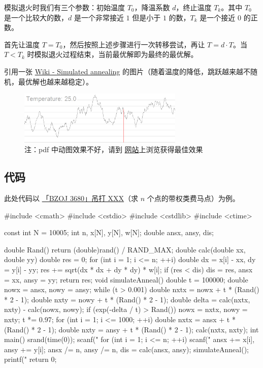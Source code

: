 模拟退火时我们有三个参数：初始温度 $T_0$，降温系数 $d$，终止温度 $T_k$。其中 $T_0$ 是一个比较大的数，$d$ 是一个非常接近 $1$ 但是小于 $1$ 的数，$T_k$ 是一个接近 $0$ 的正数。

首先让温度 $T=T_0$，然后按照上述步骤进行一次转移尝试，再让 $T=d\cdot T$。当 $T<T_k$ 时模拟退火过程结束，当前最优解即为最终的最优解。

引用一张 \href{https://en.wikipedia.org/wiki/Simulated_annealing}{Wiki - Simulated annealing} 的图片（随着温度的降低，跳跃越来越不随机，最优解也越来越稳定）。


\begin{figure}[htbp]
\centering
\includegraphics[width=0.7\textwidth]{docs/misc/images/a-0.png} 
\caption{注：pdf 中动图效果不好，请到 \href{https://oi-wiki.org/misc/simulated-annealing/}{网站}上浏览获得最佳效果}
\end{figure}

\hr

\subsection{代码}

此处代码以 \href{https://www.lydsy.com/JudgeOnline/problem.php?id=3680}{「BZOJ 3680」吊打 XXX}（求 $n$ 个点的带权类费马点）为例。

\begin{cppcode}
#include <cmath>
#include <cstdio>
#include <cstdlib>
#include <ctime>

const int N = 10005;
int n, x[N], y[N], w[N];
double ansx, ansy, dis;

double Rand() { return (double)rand() / RAND_MAX; }
double calc(double xx, double yy) {
  double res = 0;
  for (int i = 1; i <= n; ++i) {
    double dx = x[i] - xx, dy = y[i] - yy;
    res += sqrt(dx * dx + dy * dy) * w[i];
  }
  if (res < dis) dis = res, ansx = xx, ansy = yy;
  return res;
}
void simulateAnneal() {
  double t = 100000;
  double nowx = ansx, nowy = ansy;
  while (t > 0.001) {
    double nxtx = nowx + t * (Rand() * 2 - 1);
    double nxty = nowy + t * (Rand() * 2 - 1);
    double delta = calc(nxtx, nxty) - calc(nowx, nowy);
    if (exp(-delta / t) > Rand()) nowx = nxtx, nowy = nxty;
    t *= 0.97;
  }
  for (int i = 1; i <= 1000; ++i) {
    double nxtx = ansx + t * (Rand() * 2 - 1);
    double nxty = ansy + t * (Rand() * 2 - 1);
    calc(nxtx, nxty);
  }
}
int main() {
  srand(time(0));
  scanf("%
  for (int i = 1; i <= n; ++i) {
    scanf("%
    ansx += x[i], ansy += y[i];
  }
  ansx /= n, ansy /= n, dis = calc(ansx, ansy);
  simulateAnneal();
  printf("%
  return 0;
}
\end{cppcode}

